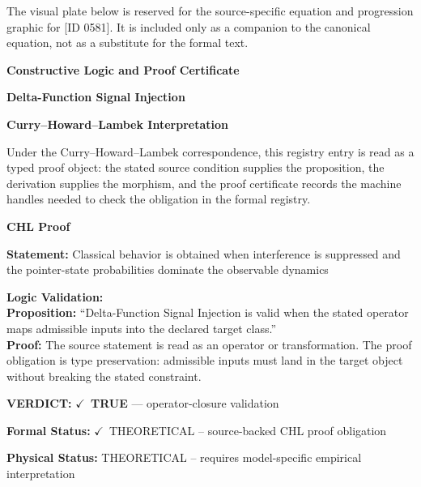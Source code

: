 \begingroup\footnotesize\sloppy
The visual plate below is reserved for the source-specific equation and progression graphic for [ID 0581]. It is included only as a companion to the canonical equation, not as a substitute for the formal text.
\par\endgroup
\ifTZPDarkEdition
{}
\fi

\clearpage
\begingroup\tzpsupportsetup
\noindent\textbf{\fontsize{10.8pt}{12.8pt}\selectfont [ID 0581] Constructive Logic and Proof Certificate}\par
\noindent\textbf{\fontsize{10pt}{12pt}\selectfont Delta-Function Signal Injection}\par
\vspace{0.45em}
\begingroup
\footnotesize
\setlength{\parskip}{0.22em}
\setlength{\parindent}{0pt}
\noindent\textbf{Curry--Howard--Lambek Interpretation}\par
Under the Curry--Howard--Lambek correspondence, this registry entry is read as a typed proof
object: the stated source condition supplies the proposition, the derivation supplies the
morphism, and the proof certificate records the machine handles needed to check the obligation
in the formal registry.

\vspace{0.45em}
\noindent\textbf{CHL Proof}\par
\textbf{Statement:} Classical behavior is obtained when interference is suppressed and the pointer-state
probabilities dominate the observable dynamics

\textbf{Logic Validation:}\\
\textbf{Proposition:} ``Delta-Function Signal Injection is valid when the stated operator maps admissible inputs
into the declared target class.''\\
\textbf{Proof:} The source statement is read as an operator or transformation. The proof obligation is
type preservation: admissible inputs must land in the target object without breaking the
stated constraint.

\textbf{VERDICT:} \ensuremath{\checkmark}\ \textbf{TRUE} --- operator-closure validation

\textbf{Formal Status:} \ensuremath{\checkmark}\ THEORETICAL -- source-backed CHL proof obligation

\textbf{Physical Status:} THEORETICAL -- requires model-specific empirical interpretation
\par\vspace{0.45em}
\par
\ifTZPDarkEdition
{}
\fi
\endgroup
\endgroup
